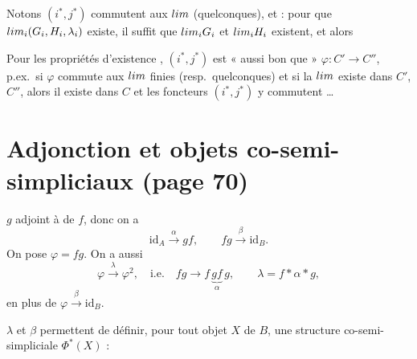 \documentclass[11pt,a4paper]{article}
\begin{document}

Notons $(i^{*}, j^{*})$ commutent aux $\varprojlim$ (quelconques), et : pour
que $\varprojlim_{i} (G_{i}, H_{i}, \lambda_{i})$ existe, il suffit que
$\varprojlim_{i} G_{i}$ et $\varprojlim_{i} H_{i}$ existent, et alors \ill{}

Pour les propriétés d'existence , $(i^{*}, j^{*})$ est
 « aussi bon que » $\varphi : C' \to C''$, p.ex.\ si
$\varphi$ commute aux $\varprojlim$ finies (resp.\ quelconques) et si \ill{}
\struck{\ill{}} la $\varprojlim$ existe dans $C'$, $C''$, alors il existe dans
$C$ et les foncteurs $(i^{*}, j^{*})$ y commutent \ldots

\section*{Adjonction et objets co-semi-simpliciaux (page 70)}



$g$ adjoint à  de $f$, donc on a 
\[
  \mathrm{id}_{A} \overset{\alpha}{\longrightarrow} gf , \qquad
  fg \overset{\beta}{\longrightarrow} \mathrm{id}_{B} .
\]
On pose $\varphi = fg$. On a aussi
\[
  \varphi \overset{\lambda}{\longrightarrow} \varphi^{2} , \quad\text{i.e.}\quad
  fg \longrightarrow f\,\underbrace{gf}_{\alpha}\,g , \qquad
  \lambda = f * \alpha * g ,
\]
en plus de $\varphi \overset{\beta}{\longrightarrow} \mathrm{id}_{B}$.

$\lambda$ et $\beta$ permettent de définir, pour tout objet $X$ de $B$, une
structure  co-semi-simpliciale $\Phi^{*}(X)$ :

\end{document}
